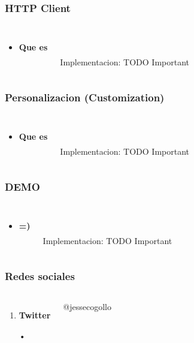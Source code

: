 \documentclass{beamer}
\begin{document}
\begin{frame}
\frametitle{HTTP Client}
\begin{columns}[c]
\begin{itemize}
\item \textbf{Que es}
\end{itemize}

\\~\\
Implementacion: TODO Important
\end{columns}
\end{frame}
\begin{frame}
\frametitle{Personalizacion (Customization)}
\begin{columns}[c]
\begin{itemize}
\item \textbf{Que es}
\end{itemize}

\\~\\
Implementacion: TODO Important
\end{columns}
\end{frame}
\begin{frame}
\frametitle{DEMO}
\begin{columns}[c]
\begin{itemize}
\item \textbf{=)}
\end{itemize}

\\~\\
Implementacion: TODO Important
\end{columns}
\end{frame}
\begin{frame}
\frametitle{Redes sociales}
\begin{columns}[c] %

\begin{enumerate}
\item \textbf{Twitter}
\item[•]
\end{enumerate}

{\color{blue}@jessecogollo}
\end{columns}
\end{frame}
\end{document}
